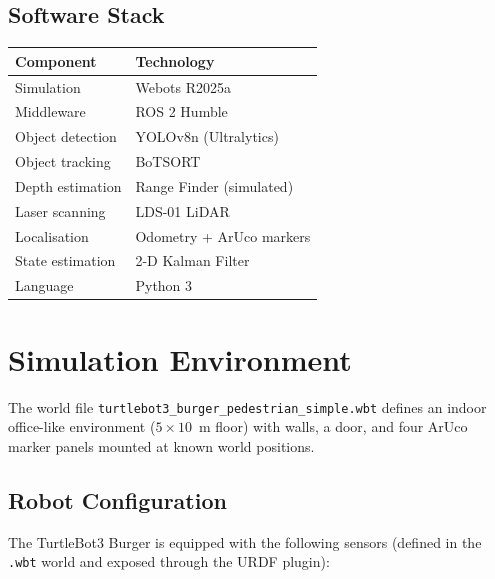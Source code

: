 \documentclass[12pt,a4paper]{article}
\begin{document}
\subsection{Software Stack}
\begin{center}
\begin{tabular}{ll}
\toprule
\textbf{Component} & \textbf{Technology} \\
\midrule
Simulation         & Webots R2025a \\
Middleware         & ROS 2 Humble \\
Object detection   & YOLOv8n (Ultralytics) \\
Object tracking    & BoTSORT \\
Depth estimation   & Range Finder (simulated) \\
Laser scanning     & LDS-01 LiDAR \\
Localisation       & Odometry + ArUco markers \\
State estimation   & 2-D Kalman Filter \\
Language           & Python 3 \\
\bottomrule
\end{tabular}
\end{center}

\section{Simulation Environment}

The world file \texttt{turtlebot3\_\allowbreak burger\_\allowbreak pedestrian\_\allowbreak simple.wbt} defines an
indoor office-like environment ($5 \times 10$~m floor) with walls, a door, and
four ArUco marker panels mounted at known world positions.

\subsection{Robot Configuration}

The TurtleBot3 Burger is equipped with the following sensors (defined in the
\texttt{.wbt} world and exposed through the URDF plugin):
\end{document}
